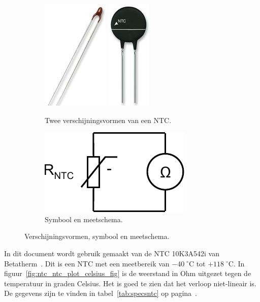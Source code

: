 \documentclass[12pt,a4paper,final,twoside,fleqn]{article}
\newcommand{\mathcelc}[1]{\mbox{$#1\;^\circ\text{C}$}}
\newcommand{\ntctype}{10K3A542i}
\newcommand{\ntcman}{Betatherm}
\begin{document}
\begin{figure}[ht!]
\begin{subfigure}[c]{0.48\textwidth}
\centering
\includegraphics[scale=0.25]{pics/thermistor1}\hspace*{1cm}
\includegraphics[scale=0.25]{pics/thermistor2}
\caption[Een NTC]{Twee verschijningsvormen van een NTC.}
\label{fig:thermistor1}
\end{subfigure}
\begin{subfigure}[c]{0.48\textwidth}
\centering
\includegraphics[scale=0.63]{drawings/ntc_symbol_meas}
\caption[Een NTC]{Symbool en meetschema.}
\label{fig:ntc_symbol_meas}
\end{subfigure}
\caption{Verschijningsvormen, symbool en meetschema.}
\label{fig:ntcpics}
\end{figure}%

In dit document wordt gebruik gemaakt van de NTC \ntctype{} van
\ntcman~\cite{betatherm10K3A542i}. Dit is een NTC met een meetbereik van
\mathcelc{-40} tot \mathcelc{+118}. In figuur~\ref{fig:ntc_ntc_plot_celsius_fig} is
de weerstand in Ohm uitgezet tegen de temperatuur in graden Celsius.
Het is goed te zien dat het verloop niet-lineair is. De gegevens
zijn te vinden in tabel~\ref{tab:specsntc} op pagina~\pageref{tab:specsntc}.
\end{document}
